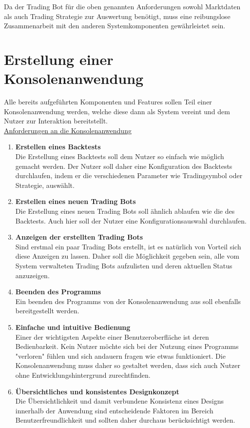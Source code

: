 \documentclass[oneside]{ausarbeitung}
\begin{document}
Da der Trading Bot für die oben genannten Anforderungen sowohl
Marktdaten als auch Trading Strategie zur Auswertung benötigt, muss
eine reibungslose Zusammenarbeit mit den anderen Systemkomponenten
gewährleistet sein.


\section{Erstellung einer Konsolenanwendung}
\label{sec:erstellung_cli}

Alle bereits aufgeführten Komponenten und Features sollen Teil einer
Konsolenanwendung werden, welche diese dann als System vereint und dem
Nutzer zur Interaktion bereitstellt. \\

\underline{Anforderungen an die Konsolenanwendung}
\begin{enumerate}
	\item \textbf{Erstellen eines Backtests} \\
		Die Erstellung eines Backtests soll dem Nutzer so einfach wie möglich
		gemacht werden. Der Nutzer soll daher eine Konfiguration des Backtests
		durchlaufen, indem er die verschiedenen Parameter wie Tradingsymbol oder 
		Strategie, auswählt.
	\item \textbf{Erstellen eines neuen Trading Bots} \\
		Die Erstellung eines neuen Trading Bots soll ähnlich ablaufen wie die des
		Backtests. Auch hier soll der Nutzer eine Konfigurationsauswahl
		durchlaufen.
	\item \textbf{Anzeigen der erstellten Trading Bots} \\
		Sind erstmal ein paar Trading Bots erstellt, ist es natürlich von Vorteil
		sich diese Anzeigen zu lassen. Daher soll die Möglichkeit gegeben sein,
		alle vom System verwalteten Trading Bots aufzulisten und deren aktuellen
		Status anzuzeigen.
	\item \textbf{Beenden des Programms} \\
		Ein beenden des Programms von der Konsolenanwendung aus soll ebenfalls
		bereitgestellt werden.
	\item \textbf{Einfache und intuitive Bedienung} \\
		Einer der wichtigsten Aspekte einer Benutzeroberfläche ist deren
		Bedienbarkeit. Kein Nutzer möchte sich bei der Nutzung eines Programms
		"verloren" fühlen und sich andauern fragen wie etwas funktioniert. Die
		Konsolenanwendung muss daher so gestaltet werden, dass sich auch Nutzer
		ohne Entwicklungshintergrund zurechtfinden.
	\item \textbf{Übersichtliches und konsistentes Designkonzept} \\
		Die Übersichtlichkeit und damit verbundene Konsistenz eines Designs 
		innerhalb der Anwendung sind entscheidende Faktoren im Bereich 
		Benutzerfreundlichkeit und sollten daher durchaus berücksichtigt werden.
\end{enumerate}
\end{document}
